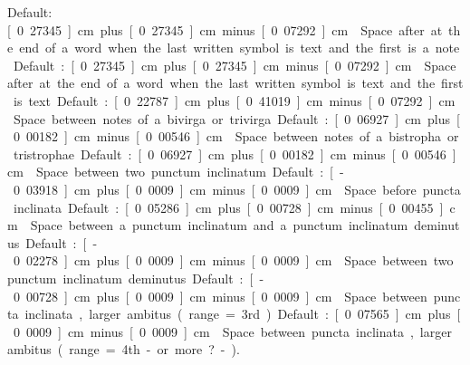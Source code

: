 Default: \unit[0.27345]{cm} plus \unit[0.27345]{cm} minus \unit[0.07292]{cm}

Space after at the end of a word when the last written symbol is text and the first is a note.  

Default: \unit[0.27345]{cm} plus \unit[0.27345]{cm} minus \unit[0.07292]{cm}

Space after at the end of a word when the last written symbol is text and the first is text.  

Default: \unit[0.22787]{cm} plus \unit[0.41019]{cm} minus \unit[0.07292]{cm}

Space between notes of a bivirga or trivirga.  

Default: \unit[0.06927]{cm} plus \unit[0.00182]{cm} minus \unit[0.00546]{cm}

Space between notes of a bistropha or tristrophae.  

Default: \unit[0.06927]{cm} plus \unit[0.00182]{cm} minus \unit[0.00546]{cm}

Space between two punctum inclinatum.  

Default: \unit[-0.03918]{cm} plus \unit[0.0009]{cm} minus \unit[0.0009]{cm}

Space before puncta inclinata.  

Default: \unit[0.05286]{cm} plus \unit[0.00728]{cm} minus \unit[0.00455]{cm}

Space between a punctum inclinatum and a punctum inclinatum deminutus.  

Default: \unit[-0.02278]{cm} plus \unit[0.0009]{cm} minus \unit[0.0009]{cm}

Space between two punctum inclinatum deminutus.  

Default: \unit[-0.00728]{cm} plus \unit[0.0009]{cm} minus \unit[0.0009]{cm}

Space between puncta inclinata, larger ambitus (range=3rd).  

Default: \unit[0.07565]{cm} plus \unit[0.0009]{cm} minus \unit[0.0009]{cm}

Space between puncta inclinata, larger ambitus (range=4th -or more?-).  

